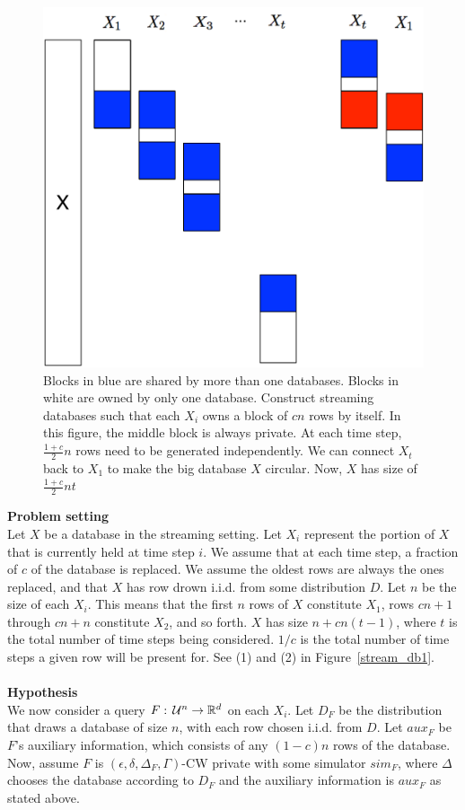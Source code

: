 \documentclass[11pt]{article}
\begin{document}
\begin{figure}[th]
\centering
\includegraphics[width=4.8in]{fig/stream_database2.pdf}
\caption{\label{stream_db2} Blocks in blue are shared by more than one databases. Blocks in white are owned by only one database. Construct streaming databases such that each $X_{i}$ owns a block of $cn$ rows by itself. In this figure, the middle block is always private. At each time step, $\frac{1+c}{2} n$ rows need to be generated independently. We can connect $X_{t}$ back to $X_{1}$ to make the big database $X$ circular. Now, $X$ has size of  $\frac{1+c}{2} nt$}
\end{figure}

{\bf Problem setting} \\
Let $X$ be a database in the streaming setting. Let $X_{i}$ represent the portion of $X$ that is currently held at time step $i$. We assume that at each time step, a fraction of $c$ of the database is replaced. We assume the oldest rows are always the ones replaced, and that $X$ has row drown i.i.d. from some distribution $D$. Let $n$ be the size of each $X_{i}$. This means that the first $n$ rows of $X$ constitute $X_{1}$, rows $cn+1$ through $cn+n$ constitute $X_{2}$, and so forth. $X$ has size $n+cn(t-1)$, where $t$ is the total number of time steps being considered. $1/c$ is the total number of time steps a given row will be present for. See (1) and (2) in Figure~\ref{stream_db1}. 
\\
\\
{\bf Hypothesis}\\
We now consider a query $F: \, {\cal U}^{n} \rightarrow \mathbb{R}^{d}$ on each $X_{i}$. 
Let $D_{F}$ be the distribution that draws a database of size $n$, with each row chosen i.i.d. from $D$. Let $aux_{F}$ be $F$'s auxiliary information, which consists of any $(1-c)n$ rows of the database. Now, assume $F$ is $(\epsilon, \delta, \Delta_{F}, \Gamma)$-CW private with some simulator $sim_{F}$, where $\Delta$ chooses the database according to $D_{F}$ and the auxiliary information is $aux_{F}$ as stated above.
\end{document}
